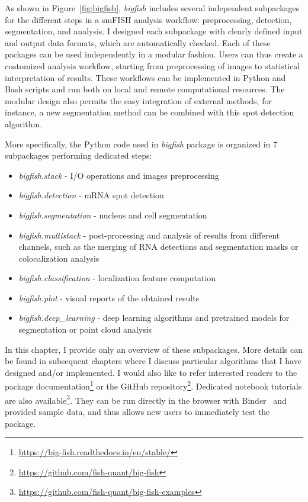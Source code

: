 As shown in Figure~\ref{fig:bigfish}, \emph{bigfish} includes several independent subpackages for the different steps in a smFISH analysis workflow: preprocessing, detection, segmentation, and analysis.
I designed each subpackage with clearly defined input and output data formats, which are automatically checked.
Each of these packages can be used independently in a modular fashion.
Users can thus create a customized analysis workflow, starting from preprocessing of images to statistical interpretation of results.
These workflows can be implemented in Python and Bash scripts and run both on local and remote computational resources.
The modular design also permits the easy integration of external methods, for instance, a new segmentation method can be combined with this spot detection algorithm.

More specifically, the Python code used in \emph{bigfish} package is organized in 7 subpackages performing dedicated steps:
\begin{itemize}
	\setlength\itemsep{0.1em}
	\item \emph{bigfish.stack} - I/O operations and images preprocessing
	\item \emph{bigfish.detection} - \ac{mRNA} spot detection
	\item \emph{bigfish.segmentation} - nucleus and cell segmentation
	\item \emph{bigfish.multistack} - post-processing and analysis of results from different channels, such as the merging of \ac{RNA} detections and segmentation masks or colocalization analysis
	\item \emph{bigfish.classification} - localization feature computation
	\item \emph{bigfish.plot} - visual reports of the obtained results
	\item \emph{bigfish.deep\_learning} - deep learning algorithms and pretrained models for segmentation or point cloud analysis
\end{itemize}

In this chapter, I provide only an overview of these subpackages.
More details can be found in subsequent chapters where I discuss particular algorithms that I have designed and/or implemented.
I would also like to refer interested readers to the package documentation\footnote{\url{https://big-fish.readthedocs.io/en/stable/}} or the GitHub repository\footnote{\url{https://github.com/fish-quant/big-fish}}.
Dedicated notebook tutorials are also available\footnote{\url{https://github.com/fish-quant/big-fish-examples}}.
They can be run directly in the browser with Binder~\cite{Jupyter2018Binder2} and provided sample data, and thus allows new users to immediately test the package.

